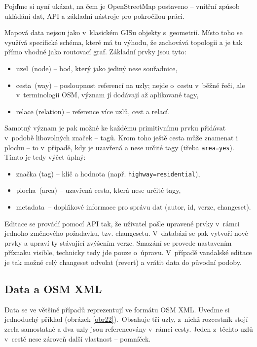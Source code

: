 Pojďme si nyní ukázat, na čem je OpenStreetMap postaveno -- vnitřní způsob ukládání dat, API a základní nástroje pro pokročilou práci.

Mapová data nejsou jako v~klasickém GISu objekty s~geometrií. Místo toho se využívá specifické schéma, které má tu výhodu, že zachovává topologii a je tak přímo vhodné jako routovací graf. Základní prvky jsou tyto:

\begin{itemize}

\item
  uzel~(node) -- bod, který jako jediný nese souřadnice,
\item
  cesta~(way) -- posloupnost referencí na uzly; nejde o~cestu v~běžné řeči, ale v~terminologii OSM, význam jí dodávají až aplikované tagy, ~
\item
  relace (relation) -- reference více uzlů, cest a relací.
\end{itemize}

Samotný význam je pak možné ke každému primitivnímu prvku přidávat v~podobě libovolných značek -- tagů. Krom toho ještě cesta může znamenat i plochu -- to v~případě, kdy je uzavřená a nese určité tagy (třeba \texttt{area=yes}). Tímto je tedy výčet úplný:

\begin{itemize}

\item
  značka (tag) -- klíč a hodnota (např. \texttt{highway=residential}),
\item
  plocha~(area) -- uzavřená cesta, která nese určité tagy,
\item
  metadata~-- doplňkové informace pro správu dat (autor, id, verze, changeset).
\end{itemize}

Editace se provádí pomocí API tak, že uživatel pošle upravené prvky v~rámci jednoho změnového požadavku, tzv. changesetu. V~databázi se pak vytvoří nové prvky a upraví ty stávající zvýšením verze. Smazání se provede nastavením příznaku visible, technicky tedy jde pouze o~úpravu. V~případě vandalské editace je tak možné celý changeset odvolat (revert) a vrátit data do původní podoby.

\subsection{Data a OSM XML}\label{data-a-osm-xml}

Data se ve většině případů reprezentují ve formátu OSM XML. Uveďme si jednoduchý příklad (obrázek \ref{obr22}).~Obsahuje tři uzly, z~nichž rozcestník stojí zcela samostatně a dva uzly jsou referencovány v~rámci cesty. Jeden z~těchto uzlů v~cestě nese zároveň další vlastnost -- pomníček.

